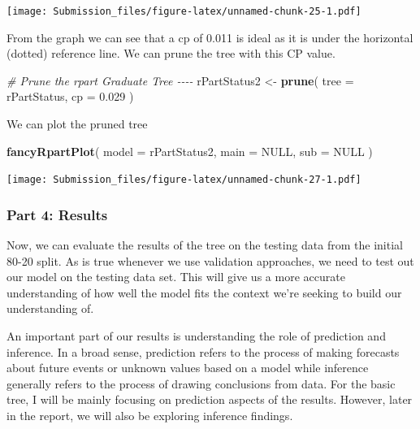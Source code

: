 \documentclass[
]{article}
\newenvironment{Shaded}{\begin{snugshade}}{\end{snugshade}}
\newcommand{\AttributeTok}[1]{\textcolor[rgb]{0.13,0.29,0.53}{#1}}
\newcommand{\CommentTok}[1]{\textcolor[rgb]{0.56,0.35,0.01}{\textit{#1}}}
\newcommand{\ConstantTok}[1]{\textcolor[rgb]{0.56,0.35,0.01}{#1}}
\newcommand{\FloatTok}[1]{\textcolor[rgb]{0.00,0.00,0.81}{#1}}
\newcommand{\FunctionTok}[1]{\textcolor[rgb]{0.13,0.29,0.53}{\textbf{#1}}}
\newcommand{\NormalTok}[1]{#1}
\newcommand{\OtherTok}[1]{\textcolor[rgb]{0.56,0.35,0.01}{#1}}
\begin{document}
\texttt{[image: Submission\_files/figure-latex/unnamed-chunk-25-1.pdf]}

From the graph we can see that a cp of 0.011 is ideal as it is under the
horizontal (dotted) reference line. We can prune the tree with this CP
value.

\begin{Shaded}
\begin{Highlighting}[]
\CommentTok{\# Prune the rpart Graduate Tree {-}{-}{-}{-}}
\NormalTok{rPartStatus2 }\OtherTok{\textless{}{-}} \FunctionTok{prune}\NormalTok{(}
  \AttributeTok{tree =}\NormalTok{ rPartStatus,}
  \AttributeTok{cp =} \FloatTok{0.029}
\NormalTok{)}
\end{Highlighting}
\end{Shaded}

We can plot the pruned tree

\begin{Shaded}
\begin{Highlighting}[]
\FunctionTok{fancyRpartPlot}\NormalTok{(}
  \AttributeTok{model =}\NormalTok{ rPartStatus2,}
  \AttributeTok{main =} \ConstantTok{NULL}\NormalTok{,}
  \AttributeTok{sub =} \ConstantTok{NULL}
\NormalTok{)}
\end{Highlighting}
\end{Shaded}

\texttt{[image: Submission\_files/figure-latex/unnamed-chunk-27-1.pdf]}

\hypertarget{part-4-results}{%
\subsubsection{Part 4: Results}\label{part-4-results}}

Now, we can evaluate the results of the tree on the testing data from
the initial 80-20 split. As is true whenever we use validation
approaches, we need to test out our model on the testing data set. This
will give us a more accurate understanding of how well the model fits
the context we're seeking to build our understanding of.

An important part of our results is understanding the role of prediction
and inference. In a broad sense, prediction refers to the process of
making forecasts about future events or unknown values based on a model
while inference generally refers to the process of drawing conclusions
from data. For the basic tree, I will be mainly focusing on prediction
aspects of the results. However, later in the report, we will also be
exploring inference findings.
\end{document}
